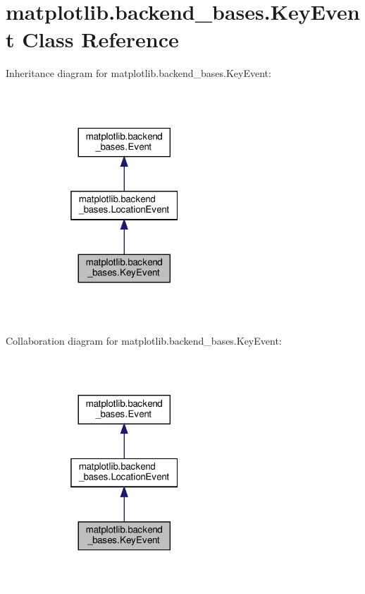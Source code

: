 \hypertarget{classmatplotlib_1_1backend__bases_1_1KeyEvent}{}\section{matplotlib.\+backend\+\_\+bases.\+Key\+Event Class Reference}
\label{classmatplotlib_1_1backend__bases_1_1KeyEvent}


Inheritance diagram for matplotlib.\+backend\+\_\+bases.\+Key\+Event\+:
\nopagebreak
\begin{figure}[H]
\begin{center}
\leavevmode
\includegraphics[width=193pt]{classmatplotlib_1_1backend__bases_1_1KeyEvent__inherit__graph}
\end{center}
\end{figure}


Collaboration diagram for matplotlib.\+backend\+\_\+bases.\+Key\+Event\+:
\nopagebreak
\begin{figure}[H]
\begin{center}
\leavevmode
\includegraphics[width=193pt]{classmatplotlib_1_1backend__bases_1_1KeyEvent__coll__graph}
\end{center}
\end{figure}
